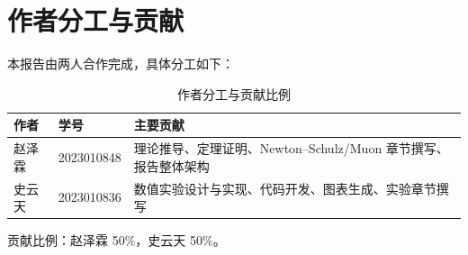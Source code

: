 \section{作者分工与贡献}

本报告由两人合作完成，具体分工如下：

\begin{table}[htbp]
  \centering
  \caption{作者分工与贡献比例}
  \label{tab:contribution}
  \begin{tabular}{@{}lll@{}}
    \toprule
    作者 & 学号 & 主要贡献 \\
    \midrule
    赵泽霖 & 2023010848 & 理论推导、定理证明、Newton--Schulz/Muon 章节撰写、报告整体架构 \\
    史云天 & 2023010836 & 数值实验设计与实现、代码开发、图表生成、实验章节撰写 \\
    \bottomrule
  \end{tabular}
\end{table}

\noindent 贡献比例：赵泽霖 50\%，史云天 50\%。
